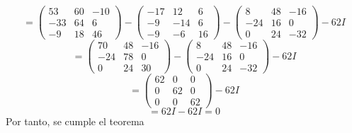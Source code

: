 \begin{itemize}
    $$=\begin{pmatrix}53&60&-10\\ -33&64&6\\ -9&18&46\end{pmatrix}-\begin{pmatrix}-17&12&6\\ -9&-14&6\\ -9&-6&16\end{pmatrix}-\begin{pmatrix}8&48&-16\\ -24&16&0\\ 0&24&-32\end{pmatrix}-62I$$
    $$=\begin{pmatrix}70&48&-16\\ -24&78&0\\ 0&24&30\end{pmatrix}-\begin{pmatrix}8&48&-16\\ -24&16&0\\ 0&24&-32\end{pmatrix}-62I$$
    $$=\begin{pmatrix}62&0&0\\ 0&62&0\\ 0&0&62\end{pmatrix}-62I$$
    $$=62I-62I=0$$
    Por tanto, se cumple el teorema 

\end{itemize}{}